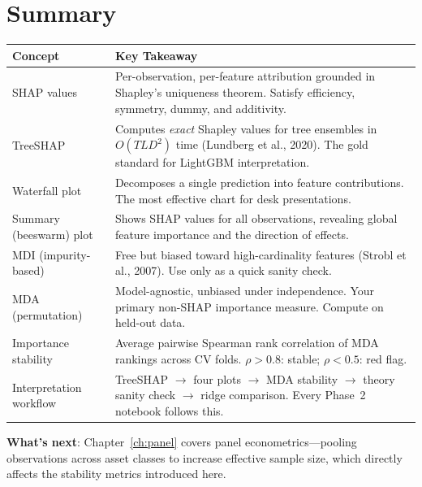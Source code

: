 \section{Summary}
\label{sec:interpretation-summary}

\begin{center}
\begin{tabular}{p{4cm} p{9.5cm}}
\toprule
\textbf{Concept} & \textbf{Key Takeaway} \\
\midrule
SHAP values & Per-observation, per-feature attribution grounded in Shapley's uniqueness theorem. Satisfy efficiency, symmetry, dummy, and additivity. \\[6pt]
TreeSHAP & Computes \emph{exact} Shapley values for tree ensembles in $O(TLD^2)$ time (Lundberg et al., 2020). The gold standard for LightGBM interpretation. \\[6pt]
Waterfall plot & Decomposes a single prediction into feature contributions. The most effective chart for desk presentations. \\[6pt]
Summary (beeswarm) plot & Shows SHAP values for all observations, revealing global feature importance and the direction of effects. \\[6pt]
MDI (impurity-based) & Free but biased toward high-cardinality features (Strobl et al., 2007). Use only as a quick sanity check. \\[6pt]
MDA (permutation) & Model-agnostic, unbiased under independence. Your primary non-SHAP importance measure. Compute on held-out data. \\[6pt]
Importance stability & Average pairwise Spearman rank correlation of MDA rankings across CV folds. $\rho > 0.8$: stable; $\rho < 0.5$: red flag. \\[6pt]
Interpretation workflow & TreeSHAP $\to$ four plots $\to$ MDA stability $\to$ theory sanity check $\to$ ridge comparison. Every Phase~2 notebook follows this. \\
\bottomrule
\end{tabular}
\end{center}

\bigskip
\noindent\textbf{What's next}: Chapter~\ref{ch:panel} covers panel econometrics---pooling observations across asset classes to increase effective sample size, which directly affects the stability metrics introduced here.
